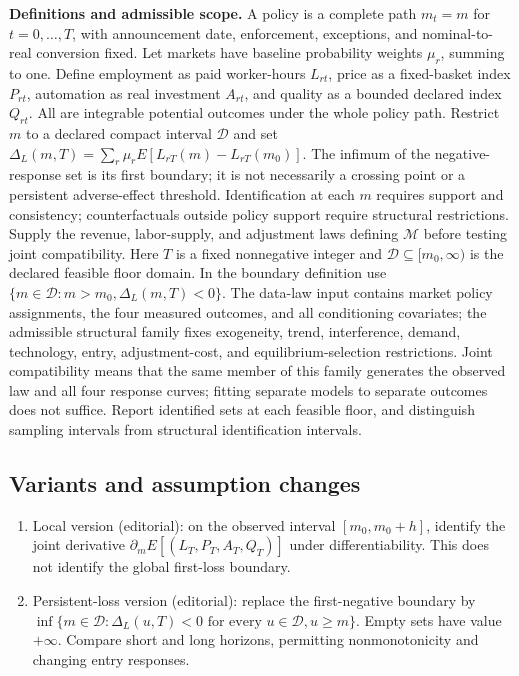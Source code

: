 \documentclass[11pt,a4paper]{article}
\begin{document}
\textbf{Definitions and admissible scope.} A policy is a complete path \(m_t=m\) for \(t=0,\ldots,T\), with announcement date, enforcement, exceptions, and nominal-to-real conversion fixed. Let markets have baseline probability weights \(\mu_r\), summing to one. Define employment as paid worker-hours \(L_{rt}\), price as a fixed-basket index \(P_{rt}\), automation as real investment \(A_{rt}\), and quality as a bounded declared index \(Q_{rt}\). All are integrable potential outcomes under the whole policy path. Restrict \(m\) to a declared compact interval \(\mathcal D\) and set \(\Delta_L(m,T)=\sum_r\mu_rE[L_{rT}(m)-L_{rT}(m_0)]\). The infimum of the negative-response set is its first boundary; it is not necessarily a crossing point or a persistent adverse-effect threshold. Identification at each \(m\) requires support and consistency; counterfactuals outside policy support require structural restrictions. Supply the revenue, labor-supply, and adjustment laws defining \(\mathcal M\) before testing joint compatibility. Here \(T\) is a fixed nonnegative integer and \(\mathcal D\subseteq[m_0,\infty)\) is the declared feasible floor domain. In the boundary definition use \(\{m\in\mathcal D:m>m_0,\Delta_L(m,T)<0\}\). The data-law input contains market policy assignments, the four measured outcomes, and all conditioning covariates; the admissible structural family fixes exogeneity, trend, interference, demand, technology, entry, adjustment-cost, and equilibrium-selection restrictions. Joint compatibility means that the same member of this family generates the observed law and all four response curves; fitting separate models to separate outcomes does not suffice. Report identified sets at each feasible floor, and distinguish sampling intervals from structural identification intervals.
\subsection*{Variants and assumption changes}
\begin{enumerate}
\item Local version (editorial): on the observed interval \([m_0,m_0+h]\), identify the joint derivative \(\partial_mE[(L_T,P_T,A_T,Q_T)]\) under differentiability. This does not identify the global first-loss boundary.
\item Persistent-loss version (editorial): replace the first-negative boundary by \(\inf\{m\in\mathcal D:\Delta_L(u,T)<0\text{ for every }u\in\mathcal D,u\ge m\}\). Empty sets have value \(+\infty\). Compare short and long horizons, permitting nonmonotonicity and changing entry responses.
\end{enumerate}
\end{document}
